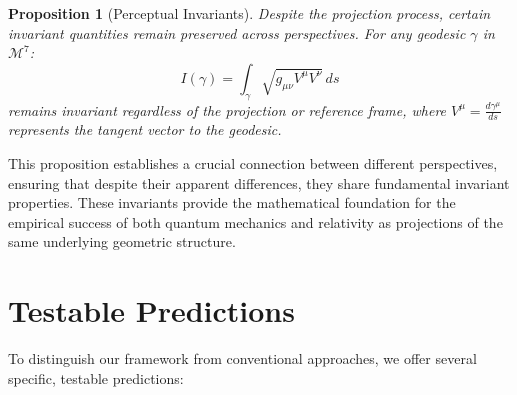 \documentclass{article}
\newtheorem{proposition}{Proposition}
\begin{document}
\begin{proposition}[Perceptual Invariants]
Despite the projection process, certain invariant quantities remain preserved across perspectives. For any geodesic $\gamma$ in $\mathcal{M}^7$:
\begin{equation}
I(\gamma) = \int_{\gamma} \sqrt{g_{\mu\nu}V^\mu V^\nu} \, ds
\end{equation}
remains invariant regardless of the projection or reference frame, where $V^\mu = \frac{d\gamma^\mu}{ds}$ represents the tangent vector to the geodesic.
\end{proposition}

This proposition establishes a crucial connection between different perspectives, ensuring that despite their apparent differences, they share fundamental invariant properties. These invariants provide the mathematical foundation for the empirical success of both quantum mechanics and relativity as projections of the same underlying geometric structure.

\section{Testable Predictions}

To distinguish our framework from conventional approaches, we offer several specific, testable predictions:
\end{document}
